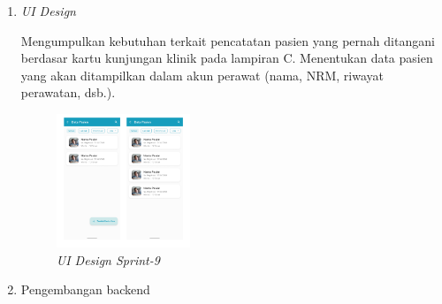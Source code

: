 \begin{enumerate}
\item \textit{UI Design}

Mengumpulkan kebutuhan terkait pencatatan pasien yang pernah ditangani berdasar kartu kunjungan klinik pada lampiran C. Menentukan data pasien yang akan ditampilkan dalam akun perawat (nama, NRM, riwayat perawatan, dsb.).
	\begin{figure}[H]
		\centering
		\includegraphics[keepaspectratio, width=4cm]{gambar/tampilan_data_pasien}
		\caption{\textit{UI Design Sprint-9} }
		\label{gambar:tampilan_data_pasien}
	\end{figure}
\item Pengembangan backend


\end{enumerate}

